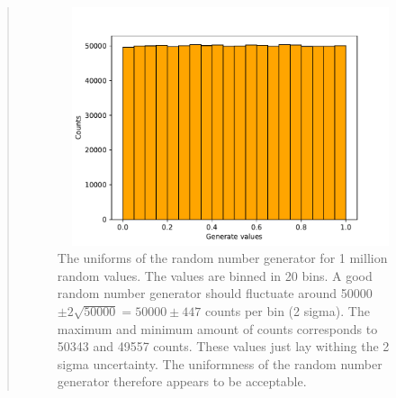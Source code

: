 \begin{quote}
\newpage
\begin{figure}[!ht]
\centering
\includegraphics[width=12cm, height=7.0cm]{./Plots/1_hist_uniformnes.pdf}
\caption{The uniforms of the random number generator for 1 million random values. The values are binned in 20 bins. A good random number generator should fluctuate around 50000 $\pm 2\sqrt{50000} = 50000 \pm 447 $ counts per bin (2 sigma). The maximum and minimum amount of counts corresponds to  50343 and 49557 counts. These values just lay withing the 2 sigma uncertainty.  The uniformness of the random number generator therefore appears to be acceptable.  }
\end{figure}
\end{quote}


%


%












